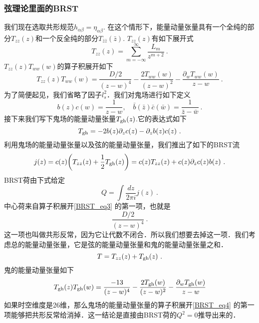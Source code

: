 \subsubsection{弦理论里面的BRST}
我们现在选取共形规范$h_{\alpha\beta} = \eta_{\alpha\beta}$. 在这个情形下，能量动量张量具有一个全纯的部分$T_{zz}(z)$和一个反全纯的部分$T_{\bar z\bar z}(\bar z)$. $T_{zz}(z)$有如下展开式
\begin{equation}
T_{zz}(z) = \sum_{m=-\infty}^{\infty} \frac{L_{m}}{z^{m+2}}~.
\end{equation}
$T_{zz}(z)T_{ww}(w)$的算子积展开如下
\begin{equation}\label{BRST_eq3}
T_{zz}(z)T_{ww}(w) = \frac{D/2}{(z-w)^4} - \frac{2T_{ww}(w)}{(z-w)^2} - \frac{\partial_wT_{ww}(w)}{z-w}~.
\end{equation}
为了简便起见，我们省略了因子$l_s^2$．我们对鬼场进行如下定义
\begin{equation}
b(z)c(w) = \frac{1}{z-w},\quad \bar b (\bar z) \bar c (\bar w) = \frac{1}{\bar z- \bar w} ~.
\end{equation} 
接下来我们写下鬼场的能量动量张量$T_{\rm gh}(z)$.它的表达式如下
\begin{equation}
T_{\rm gh} = -2 b(z) \partial_z c(z) - \partial_z b(z) c(z)~.
\end{equation}
利用鬼场的能量动量张量以及弦的能量动量张量，我们推出了如下的BRST流
\begin{equation}
j(z) = c(z) \bigg( T_{zz} (z) + \frac{1}{2} T_{\rm gh}(z) \bigg) = c(z) T_{zz} (z) + c(z) \partial_z c(z) b(z)~.
\end{equation}
BRST荷由下式给定
\begin{equation}
Q = \int \frac{dz}{2\pi i} j(z)~.
\end{equation}
中心荷来自算子积展开\autoref{BRST_eq3} 的第一项，也就是
\begin{equation}
\frac{D/2}{(z-w)^4}~.
\end{equation}
这一项也叫做共形反常，因为它让代数不闭合．所以我们想要去掉这一项．我们考虑总的能量动量张量，它是弦的能量动量张量和鬼的能量动量张量之和．
\begin{equation}
T = T_{zz} (z) + T_{\rm gh} (z)~.
\end{equation}
鬼的能量动量张量如下
\begin{equation}\label{BRST_eq4}
T_{\rm gh}(z) T_{\rm gh} (w) = \frac{-13}{(z-w)^4} - \frac{2T_{\rm gh} (w) }{(z-w)^2} - \frac{\partial_w T_{\rm gh}(w)}{z-w}
\end{equation}
如果时空维度是26维，那么鬼场的能量动量张量的算子积展开\autoref{BRST_eq4} 的第一项能够把共形反常给消掉．这一结论是直接由BRST荷的$Q^2=0$推导出来的．

